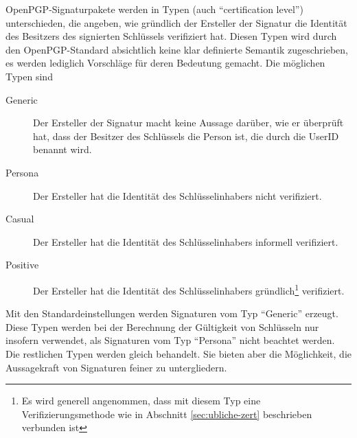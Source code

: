 OpenPGP-Signaturpakete werden in Typen (auch ``certification
level'') unterschieden, die angeben, wie gr\"undlich der Ersteller der
Signatur die Identit\"at des Besitzers des signierten Schl\"ussels
verifiziert hat. Diesen Typen wird durch den OpenPGP-Standard
absichtlich keine klar definierte Semantik zugeschrieben, es werden
lediglich Vorschl\"age f\"ur deren Bedeutung gemacht. Die m\"oglichen
Typen sind

\begin{description}
\item[Generic] Der Ersteller der Signatur macht keine Aussage
  dar\"uber, wie er \"uberpr\"uft hat, dass der Besitzer des
  Schl\"ussels die Person ist, die durch die UserID benannt wird.
\item[Persona] Der Ersteller hat die Identit\"at des
  Schl\"usselinhabers nicht verifiziert.
\item[Casual] Der Ersteller hat die Identit\"at des
  Schl\"usselinhabers informell verifiziert.
\item[Positive] Der Ersteller hat die Identit\"at des
  Schl\"usselinhabers gr\"undlich\footnote{Es wird generell
    angenommen, dass mit diesem Typ eine Verifizierungsmethode wie in
    Abschnitt \ref{sec:ubliche-zert} beschrieben verbunden ist}
  verifiziert.
\end{description}

Mit den Standardeinstellungen werden Signaturen vom Typ ``Generic''
erzeugt. Diese Typen werden bei der Berechnung der G\"ultigkeit von
Schl\"usseln nur insofern verwendet, als Signaturen vom Typ
``Persona'' nicht beachtet werden. Die restlichen Typen werden gleich
behandelt. Sie bieten aber die M\"oglichkeit, die Aussagekraft von
Signaturen feiner zu untergliedern.


